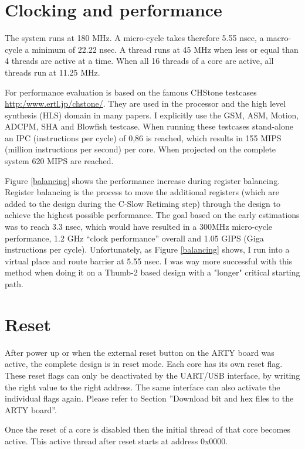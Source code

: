 \section{Clocking and performance}

The system runs at 180 MHz. A micro-cycle takes therefore 5.55 nsec, a macro-cycle a minimum of 22.22 nsec. A thread runs at 45 MHz when less or equal than 4 threads are active at a time. When all 16 threads of a core are active, all threads run at 11.25 MHz.

\vspace{1in}
For performance evaluation is based on the famous CHStone testcases \url{http:/www.ertl.jp/chstone/}. They are used in the processor and the high level synthesis (HLS) domain in many papers. I explicitly use the GSM, ASM, Motion, ADCPM, SHA and Blowfish testcase. When running these testcases stand-alone an IPC (instructions per cycle) of 0,86 is reached, which results in 155 MIPS (million instructions per second) per core. When projected on the complete system 620 MIPS are reached.

Figure \ref{balancing} shows the performance increase during register balancing. Register balancing is the process to move the additional registers (which are added to the design during the C-Slow Retiming step) through the design to achieve the highest possible performance. The goal based on the early estimations was to reach 3.3 nsec, which would have resulted in a 300MHz micro-cycle performance, 1.2 GHz “clock performance” overall and 1.05 GIPS (Giga instructions per cycle). Unfortunately, as Figure \ref{balancing} shows, I run into a virtual place and route barrier at 5.55 nsec. I was way more successful with this method when doing it on a Thumb-2 based design with a "longer" critical starting path.



\section{Reset}

After power up or when the external reset button on the ARTY board was active, the complete design is in reset  mode. Each core has its own reset flag. These reset flags can only be deactivated by the UART/USB interface, by writing the right value to the right address. The same interface can also activate the individual flags again. Please refer to Section ''Download bit and hex files to the ARTY board''.

Once the reset of a core is disabled then the initial thread of that core becomes active. This active thread after reset starts at address 0x0000. 


